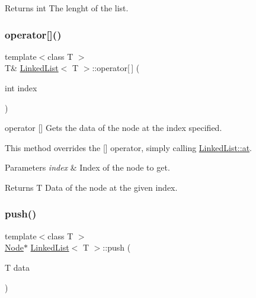 \begin{DoxyReturn}{Returns}
int The lenght of the list. 
\end{DoxyReturn}
\mbox{\label{classLinkedList_ad5254d9241ff88374dda981c68a320d7}} 
\subsubsection{\texorpdfstring{operator[]()}{operator[]()}}
{\footnotesize\ttfamily template$<$class T $>$ \\
T\& \hyperlink{classLinkedList}{Linked\+List}$<$ T $>$\+::operator\mbox{[}$\,$\mbox{]} (\begin{DoxyParamCaption}\item[{int}]{index }\end{DoxyParamCaption})\hspace{0.3cm}{\ttfamily [inline]}}



operator \mbox{[}\mbox{]} Gets the data of the node at the index specified. 

This method overrides the \mbox{[}\mbox{]} operator, simply calling \hyperlink{classLinkedList_ae3f37e8947f8fc4dd932bcf41d0344ec}{Linked\+List\+::at}.


\begin{DoxyParams}{Parameters}
{\em index} & Index of the node to get. \\
\hline
\end{DoxyParams}
\begin{DoxyReturn}{Returns}
T Data of the node at the given index. 
\end{DoxyReturn}
\mbox{\label{classLinkedList_a3a1e6c2009b611fb4416574178b316a3}} 
\subsubsection{\texorpdfstring{push()}{push()}}
{\footnotesize\ttfamily template$<$class T $>$ \\
\hyperlink{structLinkedList_1_1Node}{Node}$\ast$ \hyperlink{classLinkedList}{Linked\+List}$<$ T $>$\+::push (\begin{DoxyParamCaption}\item[{T}]{data }\end{DoxyParamCaption})\hspace{0.3cm}{\ttfamily [inline]}}



